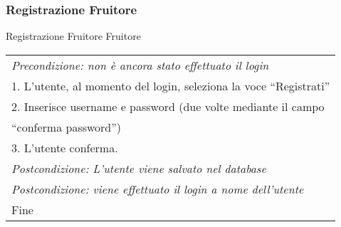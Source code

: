 \begin{minipage}{\textwidth}
    \subsubsection{Registrazione Fruitore}
    \usecase
        {Registrazione Fruitore}
        {
            Fruitore
        }
        {
            \begin{tabular}{l}
                \textit{Precondizione: non è ancora stato effettuato il login}\\
                1. L'utente, al momento del login, seleziona la voce ``Registrati''\\
                2. Inserisce username e password (due volte mediante il campo \\ ``conferma password'')\\
                3. L'utente conferma.\\
                \textit{Postcondizione: L'utente viene salvato nel database}\\
                \textit{Postcondizione: viene effettuato il login a nome dell'utente}\\
                Fine
            \end{tabular} \\

            \\

            \\

}
\end{minipage}
